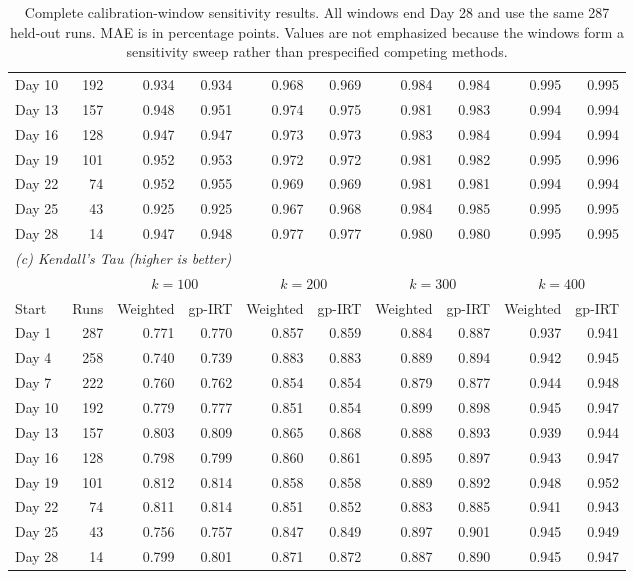 \begin{table}[t]
\begin{tabular}{lrrrrrrrrr}
    Day 10 & 192 & 0.934 & 0.934 & 0.968 & 0.969 & 0.984 & 0.984 & 0.995 & 0.995 \\
    Day 13 & 157 & 0.948 & 0.951 & 0.974 & 0.975 & 0.981 & 0.983 & 0.994 & 0.994 \\
    Day 16 & 128 & 0.947 & 0.947 & 0.973 & 0.973 & 0.983 & 0.984 & 0.994 & 0.994 \\
    Day 19 & 101 & 0.952 & 0.953 & 0.972 & 0.972 & 0.981 & 0.982 & 0.995 & 0.996 \\
    Day 22 & 74 & 0.952 & 0.955 & 0.969 & 0.969 & 0.981 & 0.981 & 0.994 & 0.994 \\
    Day 25 & 43 & 0.925 & 0.925 & 0.967 & 0.968 & 0.984 & 0.985 & 0.995 & 0.995 \\
    Day 28 & 14 & 0.947 & 0.948 & 0.977 & 0.977 & 0.980 & 0.980 & 0.995 & 0.995 \\
    \midrule
    \multicolumn{10}{l}{\textit{(c) Kendall's Tau (higher is better)}} \\
    \multicolumn{2}{c}{} & \multicolumn{2}{c}{${k=100}$} & \multicolumn{2}{c}{${k=200}$} & \multicolumn{2}{c}{${k=300}$} & \multicolumn{2}{c}{${k=400}$} \\
    Start & Runs & Weighted & gp-IRT & Weighted & gp-IRT & Weighted & gp-IRT & Weighted & gp-IRT \\
    \midrule
    Day 1 & 287 & 0.771 & 0.770 & 0.857 & 0.859 & 0.884 & 0.887 & 0.937 & 0.941 \\
    Day 4 & 258 & 0.740 & 0.739 & 0.883 & 0.883 & 0.889 & 0.894 & 0.942 & 0.945 \\
    Day 7 & 222 & 0.760 & 0.762 & 0.854 & 0.854 & 0.879 & 0.877 & 0.944 & 0.948 \\
    Day 10 & 192 & 0.779 & 0.777 & 0.851 & 0.854 & 0.899 & 0.898 & 0.945 & 0.947 \\
    Day 13 & 157 & 0.803 & 0.809 & 0.865 & 0.868 & 0.888 & 0.893 & 0.939 & 0.944 \\
    Day 16 & 128 & 0.798 & 0.799 & 0.860 & 0.861 & 0.895 & 0.897 & 0.943 & 0.947 \\
    Day 19 & 101 & 0.812 & 0.814 & 0.858 & 0.858 & 0.889 & 0.892 & 0.948 & 0.952 \\
    Day 22 & 74 & 0.811 & 0.814 & 0.851 & 0.852 & 0.883 & 0.885 & 0.941 & 0.943 \\
    Day 25 & 43 & 0.756 & 0.757 & 0.847 & 0.849 & 0.897 & 0.901 & 0.945 & 0.949 \\
    Day 28 & 14 & 0.799 & 0.801 & 0.871 & 0.872 & 0.887 & 0.890 & 0.945 & 0.947 \\
    \bottomrule
  \end{tabular}
  \caption{Complete calibration-window sensitivity results. All windows end Day 28 and use the same 287 held-out runs. MAE is in percentage points. Values are not emphasized because the windows form a sensitivity sweep rather than prespecified competing methods.}
  \label{tab:calibration-window-complete}
\end{table}
